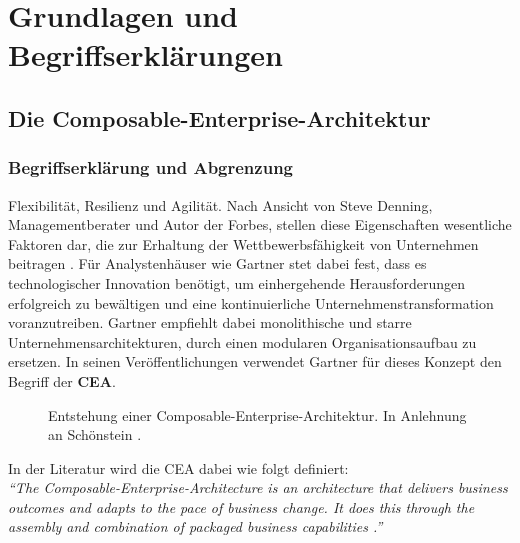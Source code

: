 \section{Grundlagen und Begriffserklärungen}

\subsection{Die Composable-Enterprise-Architektur}

\subsubsection{Begriffserklärung und Abgrenzung}
\label{sec:CEA_B}
Flexibilität, Resilienz und Agilität. Nach Ansicht von Steve Denning, Managementberater und Autor der Forbes, stellen diese Eigenschaften wesentliche Faktoren dar, die zur Erhaltung der Wettbewerbsfähigkeit von Unternehmen beitragen \cite{Denning.20170210}. Für Analystenhäuser wie Gartner stet dabei fest, dass es technologischer Innovation benötigt, um einhergehende Herausforderungen erfolgreich zu bewältigen und eine kontinuierliche Unternehmenstransformation voranzutreiben. Gartner empfiehlt dabei monolithische und starre Unternehmensarchitekturen, durch einen modularen Organisationsaufbau zu ersetzen. In seinen Veröffentlichungen verwendet Gartner für dieses Konzept den Begriff der \textbf{\ac{CEA}}.
\begin{center}
	\begin{figure}[H]
		\centering
		\caption[Entstehung einer Composable-Enterprise-Architektur]{Entstehung einer Composable-Enterprise-Architektur. In Anlehnung an Schönstein \cite{Schonenstein.20230103}.}
		\label{fig:CEA_S}
	\end{figure}	
\end{center}
\vspace*{-15mm}
In der Literatur wird die CEA dabei wie folgt definiert:\vspace{2mm}\\
\textit{\enquote{The Composable-Enterprise-Architecture is an architecture that delivers business outcomes and adapts to the pace of business change. It does this through the assembly and combination of packaged business capabilities \cite{.20230313}.}}\vspace{2mm}\\
